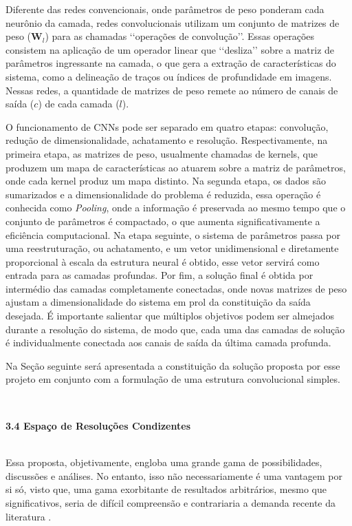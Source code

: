 \documentclass[a4paper, 12pt]{report}
\begin{document}
Diferente das redes convencionais, onde parâmetros de peso ponderam cada neurônio da camada, redes convolucionais utilizam um conjunto de matrizes de peso ($\mathbf{W}_l$) para as chamadas {\lq\lq}operações de convolução{\rq\rq}. Essas operações consistem na aplicação de um operador linear que {\lq\lq}desliza{\rq\rq} sobre a matriz de parâmetros ingressante na camada, o que gera a extração de características do sistema, como a delineação de traços ou índices de profundidade em imagens. Nessas redes, a quantidade de matrizes de peso remete ao número de canais de saída ($c$) de cada camada ($l$). 

O funcionamento de CNNs pode ser separado em quatro etapas: convolução, redução de dimensionalidade, achatamento e resolução. Respectivamente, na primeira etapa, as matrizes de peso, usualmente chamadas de kernels, que produzem um mapa de características ao atuarem sobre a matriz de parâmetros, onde cada kernel produz um mapa distinto. Na segunda etapa, os dados são sumarizados e a dimensionalidade do problema é reduzida, essa operação é conhecida como \textit{Pooling}, onde a informação é preservada ao mesmo tempo que o conjunto de parâmetros é compactado, o que aumenta significativamente a eficiência computacional. Na etapa seguinte, o sistema de parâmetros passa por uma reestruturação, ou achatamento, e um vetor unidimensional e diretamente proporcional à escala da estrutura neural é obtido, esse vetor servirá como entrada para as camadas profundas. Por fim, a solução final é obtida por intermédio das camadas completamente conectadas, onde novas matrizes de peso ajustam a dimensionalidade do sistema em prol da constituição da saída desejada. É importante salientar que múltiplos objetivos podem ser almejados durante a resolução do sistema, de modo que, cada uma das camadas de solução é individualmente conectada aos canais de saída da última camada profunda.

Na Seção seguinte será apresentada a constituição da solução proposta por esse projeto em conjunto com a formulação de uma estrutura convolucional simples.

$\frac{}{}$\\
\begin{Large}
	\textbf{3.4 Espaço de Resoluções Condizentes}
\end{Large}
$\frac{}{}$\\

Essa proposta, objetivamente, engloba uma grande gama de possibilidades, discussões e análises. No entanto, isso não necessariamente é uma vantagem por si só, visto que, uma gama exorbitante de resultados arbitrários, mesmo que significativos, seria de difícil compreensão e contrariaria a demanda recente da literatura \cite{Zitu2024Dec,Hays2024Dec,Binzagr2024Apr}.
\end{document}
